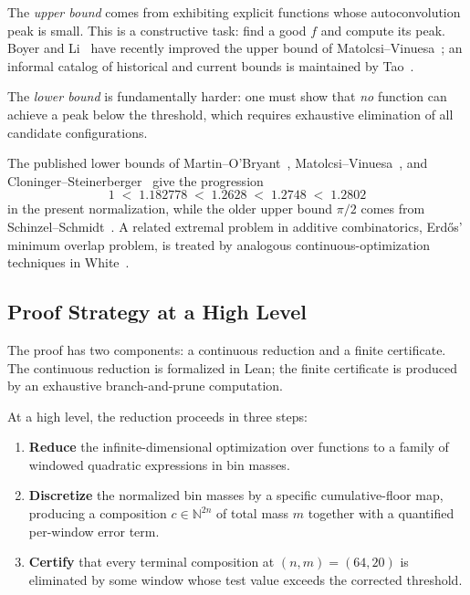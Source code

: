 \documentclass[11pt, letterpaper]{article}
\theoremstyle{paperplain}
\theoremstyle{paperdef}
\begin{document}
The \emph{upper bound} comes from exhibiting explicit functions whose
autoconvolution peak is small.  This is a constructive task: find a
good $f$ and compute its peak.  Boyer and Li~\cite{BL26} have recently
improved the upper bound of Matolcsi--Vinuesa~\cite{MV10}; an informal
catalog of historical and current bounds is maintained by
Tao~\cite{Tao}.

The \emph{lower bound} is fundamentally harder: one must show that
\emph{no} function can achieve a peak below the threshold, which
requires exhaustive elimination of all candidate configurations.

The published lower bounds of Martin--O'Bryant~\cite{MO2007,MO2009},
Matolcsi--Vinuesa~\cite{MV10}, and
Cloninger--Steinerberger~\cite{CS17} give the progression
\[
  1 \;<\; 1.182778 \;<\; 1.2628 \;<\; 1.2748 \;<\; 1.2802
\]
in the present normalization, while the older upper bound $\pi/2$
comes from Schinzel--Schmidt~\cite{SS2002}.  A related extremal problem
in additive combinatorics, Erd\H{o}s' minimum overlap problem, is
treated by analogous continuous-optimization techniques in
White~\cite{White22}.

\subsection{Proof Strategy at a High Level}

The proof has two components: a continuous reduction and a finite
certificate.  The continuous reduction is formalized in Lean; the
finite certificate is produced by an exhaustive branch-and-prune
computation.

At a high level, the reduction proceeds in three steps:

\begin{enumerate}[label=(\roman*)]
  \item \textbf{Reduce} the infinite-dimensional optimization
    over functions to a family of windowed quadratic expressions in bin
    masses.

  \item \textbf{Discretize} the normalized bin masses by a specific
    cumulative-floor map, producing a composition
    $c \in \mathbb{N}^{2n}$ of total mass $m$ together with a
    quantified per-window error term.

  \item \textbf{Certify} that every terminal composition at
    $(n,m)=(64,20)$ is eliminated by some window whose test value
    exceeds the corrected threshold.
\end{enumerate}
\end{document}
